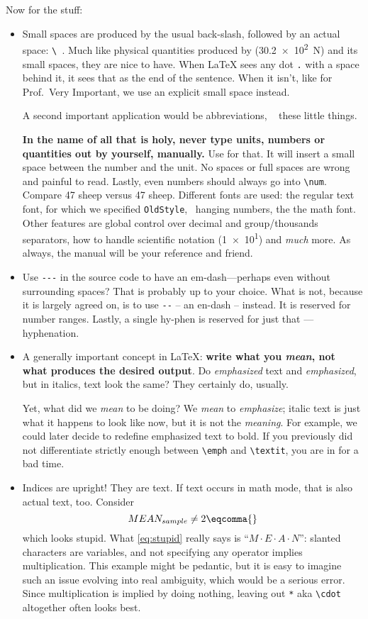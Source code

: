 Now for the stuff:
\begin{itemize}
	\item Small spaces are produced by the usual back-slash, followed by an actual space: \verb|\ |.
	Much like physical quantities produced by  (\SI{30.2e2}{\newton}) and its small spaces, they are nice to have.
	When \LaTeX{} sees any dot \verb|.| with a space behind it, it sees that as the end of the sentence.
	When it isn't, like for Prof.\ Very Important, we use an explicit small space instead.
	
	A second important application would be abbreviations, \ \textleftarrow{} these little things.
	
	\textbf{In the name of all that is holy, never type units, numbers or quantities out by yourself, manually.}
	Use  for that.
	It will insert a small space between the number and the unit.
	No spaces or full spaces are wrong and painful to read.
	Lastly, even numbers should always go into \verb|\num|.
	Compare 47 sheep versus \num{47} sheep.
	Different fonts are used: the regular text font, for which we specified \verb|OldStyle|, \ hanging numbers, the the math font.
	Other features are global control over decimal and group/thousands separators, how to handle scientific notation (\num{1e1}) and \emph{much} more.
	As always, the manual will be your reference and friend.
	\item Use \verb|---| in the source code to have an em-dash---perhaps even without surrounding spaces?
	That is probably up to your choice.
	What is not, because it is largely agreed on, is to use \verb|--| -- an en-dash -- instead.
	It is reserved for number ranges.
	Lastly, a single hy-phen is reserved for just that --- hyphenation.
	\item A generally important concept in \LaTeX{}:
	\textbf{write what you \emph{mean}, not what produces the desired output}.
	Do \emph{emphasized} text and \textit{emphasized}, but in italics, text look the same?
	They certainly do, usually.
	
	Yet, what did we \emph{mean} to be doing?
	We \emph{mean} to \emph{emphasize}; italic text is just what it happens to look like now, but it is not the \emph{meaning}.
	For example, we could later decide to redefine emphasized text to bold.
	If you previously did not differentiate strictly enough between \verb|\emph| and \verb|\textit|, you are in for a bad time.
	\item Indices are upright!
	They are text.
	If text occurs in math mode, that is also actual text, too.
	Consider
	\begin{equation}\label{eq:stupid}
		MEAN_{sample} \neq 2\eqcomma{}
	\end{equation}
	which looks stupid.
	What \cref{eq:stupid} really says is \enquote{\(M \cdot E \cdot A \cdot N\)}: slanted characters are variables, and not specifying any operator implies multiplication.
	This example might be pedantic, but it is easy to imagine such an issue evolving into real ambiguity, which would be a serious error.
	Since multiplication is implied by doing nothing, leaving out \verb|*| aka \verb|\cdot| altogether often looks best.
	

\end{itemize}
